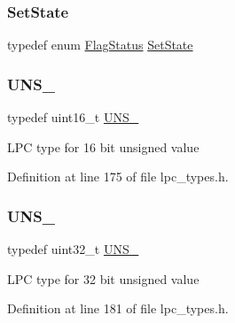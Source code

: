 \mbox{\label{group___l_p_c___types___public___types_ga7fab312a9f10f1386a955977d2ec96fe}} 
\subsubsection{\texorpdfstring{Set\+State}{SetState}}
{\footnotesize\ttfamily typedef  enum \hyperlink{group___l_p_c___types___public___types_ga89136caac2e14c55151f527ac02daaff}{Flag\+Status}  \hyperlink{group___l_p_c___types___public___types_ga7fab312a9f10f1386a955977d2ec96fe}{Set\+State}}

\mbox{\label{group___l_p_c___types___public___types_gafce87a7f2271b2cf38d7532f157f8a50}} 
\subsubsection{\texorpdfstring{U\+N\+S\+\_}{UNS\_16}}
{\footnotesize\ttfamily typedef uint16\+\_\+t \hyperlink{group___l_p_c___types___public___types_gafce87a7f2271b2cf38d7532f157f8a50}{U\+N\+S\+\_}}

L\+PC type for 16 bit unsigned value 

Definition at line 175 of file lpc\+\_\+types.\+h.

\mbox{\label{group___l_p_c___types___public___types_ga28adf5c6b1811ca447826319598d8aba}} 
\subsubsection{\texorpdfstring{U\+N\+S\+\_}{UNS\_32}}
{\footnotesize\ttfamily typedef uint32\+\_\+t \hyperlink{group___l_p_c___types___public___types_ga28adf5c6b1811ca447826319598d8aba}{U\+N\+S\+\_}}

L\+PC type for 32 bit unsigned value 

Definition at line 181 of file lpc\+\_\+types.\+h.

